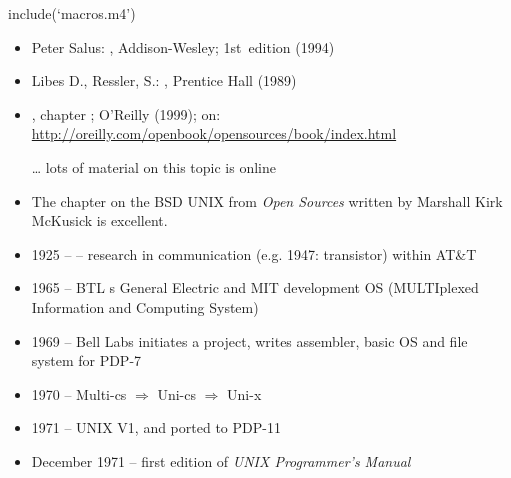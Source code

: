 
include(`macros.m4')


\begin{slide}
\begin{itemize}
\item Peter Salus: , Addison-Wesley;
1st~edition (1994)
\item Libes D., Ressler, S.: , Prentice Hall (1989)
\item {},
chapter ; O'Reilly (1999); on:
\url{http://oreilly.com/openbook/opensources/book/index.html}
\item[\ldots] lots of material on this topic is online
\end{itemize}
\end{slide}

\begin{itemize}
\item The chapter on the BSD UNIX from \emph{Open Sources} written by Marshall
Kirk McKusick is excellent.
\end{itemize}


\begin{slide}
\begin{itemize}
\item 1925 --  -- research in
communication (e.g. 1947: transistor) within AT\&T
\item 1965 -- BTL s General Electric and MIT development OS 
(MULTIplexed Information and Computing System) 
\item 1969 -- Bell Labs initiates a project,  writes
assembler, basic OS and file system for PDP-7 
\item 1970 -- Multi-cs $\Rightarrow$ Uni-cs $\Rightarrow$ Uni-x
\item 1971 -- UNIX V1, and ported to PDP-11
\item December 1971 -- first edition of \emph{UNIX Programmer's Manual}
\end{itemize}
\end{slide}

